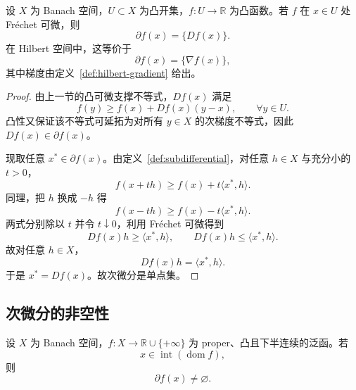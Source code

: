 \begin{proposition}[可微点的单值次微分]\label{prop:frechet-subdifferential-singleton}
设 $X$ 为 Banach 空间，$U\subset X$ 为凸开集，$f\colon U\to \mathbb R$ 为凸函数。若 $f$ 在 $x\in U$ 处 Fréchet 可微，则
\[
\partial f(x)=\{Df(x)\}.
\]
在 Hilbert 空间中，这等价于
\[
\partial f(x)=\{\nabla f(x)\},
\]
其中梯度由定义~\ref{def:hilbert-gradient} 给出。
\end{proposition}

\begin{proof}
由上一节的凸可微支撑不等式，$Df(x)$ 满足
\[
f(y)\ge f(x)+Df(x)(y-x),\qquad \forall y\in U.
\]
凸性又保证该不等式可延拓为对所有 $y\in X$ 的次梯度不等式，因此 $Df(x)\in\partial f(x)$。

现取任意 $x^\ast\in \partial f(x)$。由定义~\ref{def:subdifferential}，对任意 $h\in X$ 与充分小的 $t>0$，
\[
f(x+th)\ge f(x)+t\langle x^\ast,h\rangle.
\]
同理，把 $h$ 换成 $-h$ 得
\[
f(x-th)\ge f(x)-t\langle x^\ast,h\rangle.
\]
两式分别除以 $t$ 并令 $t\downarrow 0$，利用 Fréchet 可微得到
\[
Df(x)h\ge \langle x^\ast,h\rangle,\qquad
Df(x)h\le \langle x^\ast,h\rangle.
\]
故对任意 $h\in X$，
\[
Df(x)h=\langle x^\ast,h\rangle.
\]
于是 $x^\ast=Df(x)$。故次微分是单点集。
\end{proof}

\subsection{次微分的非空性}

\begin{theorem}[内点处次微分非空]\label{thm:subdifferential-nonempty-interior}
设 $X$ 为 Banach 空间，$f\colon X\to \mathbb R\cup\{+\infty\}$ 为 proper、凸且下半连续的泛函。若
\[
x\in \operatorname{int}(\operatorname{dom}f),
\]
则
\[
\partial f(x)\neq \varnothing.
\]
\end{theorem}

